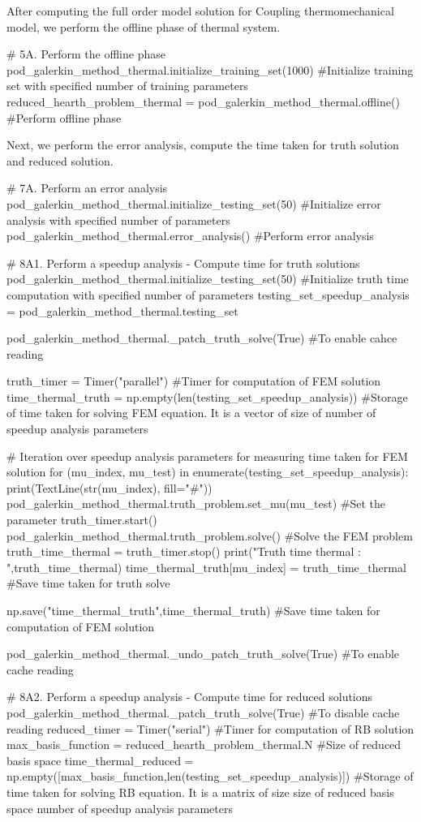 After computing the full order model solution for Coupling thermomechanical model, we perform the offline phase of thermal system.
\begin{python}
# 5A. Perform the offline phase
pod_galerkin_method_thermal.initialize_training_set(1000) #Initialize training set with specified number of training parameters
reduced_hearth_problem_thermal = pod_galerkin_method_thermal.offline() #Perform offline phase
\end{python}

Next, we perform the error analysis, compute the time taken for truth solution and reduced solution.
\begin{python}
# 7A. Perform an error analysis
pod_galerkin_method_thermal.initialize_testing_set(50) #Initialize error analysis with specified number of parameters
pod_galerkin_method_thermal.error_analysis() #Perform error analysis

# 8A1. Perform a speedup analysis - Compute time for truth solutions
pod_galerkin_method_thermal.initialize_testing_set(50) #Initialize truth time computation with specified number of parameters
testing_set_speedup_analysis = pod_galerkin_method_thermal.testing_set

pod_galerkin_method_thermal._patch_truth_solve(True) #To enable cahce reading

truth_timer = Timer("parallel") #Timer for computation of FEM solution
time_thermal_truth = np.empty(len(testing_set_speedup_analysis)) #Storage of time taken for solving FEM equation. It is a vector of size of number of speedup analysis parameters

# Iteration over speedup analysis parameters for measuring time taken for FEM solution
for (mu_index, mu_test) in enumerate(testing_set_speedup_analysis):
	print(TextLine(str(mu_index), fill="#"))
	pod_galerkin_method_thermal.truth_problem.set_mu(mu_test) #Set the parameter
	truth_timer.start()
	pod_galerkin_method_thermal.truth_problem.solve() #Solve the FEM problem
	truth_time_thermal = truth_timer.stop()
	print("Truth time thermal : ",truth_time_thermal)
	time_thermal_truth[mu_index] = truth_time_thermal #Save time taken for truth solve

np.save("time_thermal_truth",time_thermal_truth) #Save time taken for computation of FEM solution

pod_galerkin_method_thermal._undo_patch_truth_solve(True) #To enable cache reading

# 8A2. Perform a speedup analysis - Compute time for reduced solutions
pod_galerkin_method_thermal._patch_truth_solve(True) #To disable cache reading
reduced_timer = Timer("serial") #Timer for computation of RB solution
max_basis_function = reduced_hearth_problem_thermal.N #Size of reduced basis space
time_thermal_reduced = np.empty([max_basis_function,len(testing_set_speedup_analysis)]) #Storage of time taken for solving RB equation. It is a matrix of size size of reduced basis space \times number of speedup analysis parameters


\end{python}
